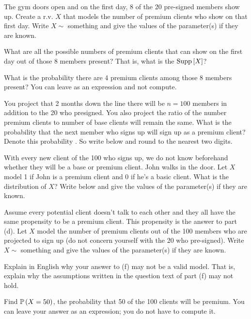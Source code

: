 \documentclass[12pt]{article}
\begin{document}
\benum

 The gym doors open and on the first day, 8 of the 20 pre-signed members show up. Create a r.v. $X$ that models the number of premium clients who show on that first day. Write $X \sim$ something and give the values of the parameter(s) if they are known.

 What are all the possible numbers of premium clients that can show on the first day out of those 8 members present? That is, what is the $\text{Supp}\left[X\right]$? 

 What is the probability there are 4 premium clients among those 8 members present? You can leave as an expression and not compute. 

 You project that 2 months down the line there will be $n=100$ members in addition to the 20 who presigned. You also project the ratio of the number premium clients to number of base clients will remain the same. What is the probability that the next member who signs up will sign up as a premium client? Denote this probability . So write  below and round to the nearest two digits. 

 With every new client of the 100 who signs up, we do not know beforehand whether they will be a base or premium client. John walks in the door. Let $X$ model 1 if John is a premium client and 0 if he's a basic client. What is the distribution of $X$? Write  below and give the values of the parameter(s) if they are known.

 Assume every potential client doesn't talk to each other and they all have the same propensity to be a premium client. This propensity is the answer to part (d). Let $X$ model the number of premium clients out of the 100 members who are projected to sign up (do not concern yourself with the 20 who pre-signed).  Write $X \sim$ something and give the values of the parameter(s) if they are known. 

 Explain in English why your answer to (f) may not be a valid model. That is, explain why the assumptions written in the question text of part (f) may not hold.  

 Find $\mathbb{P}\left(X=50\right)$, the probability that 50 of the 100 clients will be premium. You can leave your answer as an expression; you do not have to compute it.  
\end{document}
